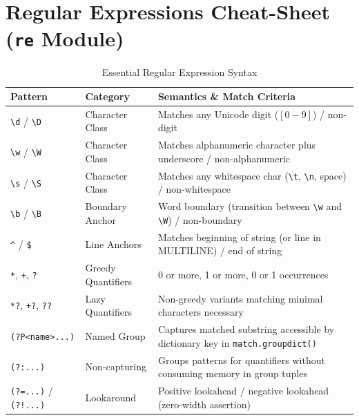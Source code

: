 \section{Regular Expressions Cheat-Sheet (\texttt{re} Module)}
\begin{table}[htbp]
\centering
\small
\begin{tabularx}{\linewidth}{llX}
\toprule
\textbf{Pattern} & \textbf{Category} & \textbf{Semantics \& Match Criteria} \\
\midrule
\texttt{\textbackslash d} / \texttt{\textbackslash D} & Character Class & Matches any Unicode digit ($[0-9]$) / non-digit \\
\texttt{\textbackslash w} / \texttt{\textbackslash W} & Character Class & Matches alphanumeric character plus underscore / non-alphanumeric \\
\texttt{\textbackslash s} / \texttt{\textbackslash S} & Character Class & Matches any whitespace char (\texttt{\textbackslash t}, \texttt{\textbackslash n}, space) / non-whitespace \\
\texttt{\textbackslash b} / \texttt{\textbackslash B} & Boundary Anchor & Word boundary (transition between \texttt{\textbackslash w} and \texttt{\textbackslash W}) / non-boundary \\
\texttt{\textasciicircum{}} / \texttt{\$} & Line Anchors & Matches beginning of string (or line in MULTILINE) / end of string \\
\texttt{*}, \texttt{+}, \texttt{?} & Greedy Quantifiers & 0 or more, 1 or more, 0 or 1 occurrences \\
\texttt{*?}, \texttt{+?}, \texttt{??} & Lazy Quantifiers & Non-greedy variants matching minimal characters necessary \\
\texttt{(?P<name>...)} & Named Group & Captures matched substring accessible by dictionary key in \texttt{match.groupdict()} \\
\texttt{(?:...)} & Non-capturing & Groups patterns for quantifiers without consuming memory in group tuples \\
\texttt{(?=...)} / \texttt{(?!...)} & Lookaround & Positive lookahead / negative lookahead (zero-width assertion) \\
\bottomrule
\end{tabularx}
\caption{Essential Regular Expression Syntax}
\end{table}
